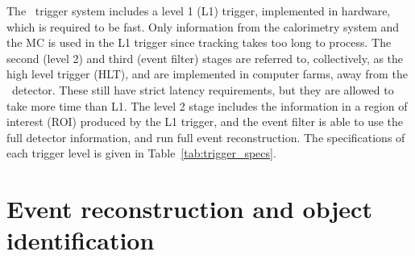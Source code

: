 The \atlas\ trigger system includes a level 1 (L1) trigger, implemented in
hardware, which is required to be fast.
Only information from the calorimetry system and the MC is used in the L1
trigger since tracking takes too long to process.
The second (level 2) and third (event filter) stages are referred to,
collectively, as the high level trigger (HLT), and are implemented in computer
farms, away from the \atlas\ detector.
These still have strict latency requirements, but they are allowed to take
more time than L1.
The level 2 stage includes the information in a region of interest (ROI)
produced by the L1 trigger, and the event filter is able to use the full
detector information, and run full event reconstruction.
The specifications of each trigger level is given in
Table~\ref{tab:trigger_specs}.

\begin{table}[ht]
  \caption{
    Specifications of the three levels of the \atlas\ trigger system.
  }
  \label{tab:trigger_specs}
\end{table}

\FloatBarrier
\section{Event reconstruction and object identification}
\label{sec:event_reco}

